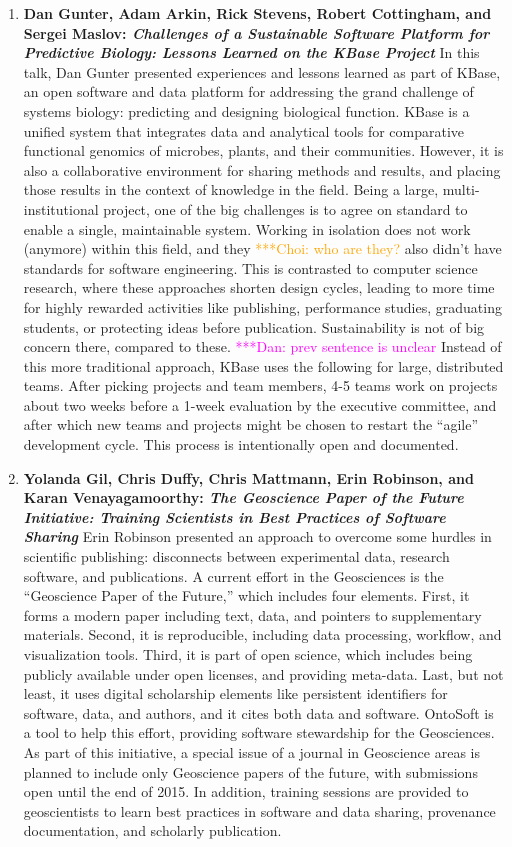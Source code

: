 \documentclass[11pt, oneside]{amsart}
\newcommand{\katznote}[1]{ {\textcolor{magenta}    { ***Dan:      #1 }}}
\newcommand{\choinote}[1]{ {\textcolor{orange}    {***Choi: #1 }}}
\begin{document}
\begin{enumerate}
\item \textbf{Dan Gunter, Adam Arkin, Rick Stevens, Robert Cottingham, and Sergei
Maslov: \textit{Challenges of a Sustainable Software Platform for Predictive
Biology: Lessons Learned on the KBase Project}} In this talk, Dan Gunter
presented experiences and lessons learned as part of KBase, an open software and
data platform for addressing the grand challenge of systems biology: predicting
and designing biological function. KBase is a unified system that integrates
data and analytical tools for comparative functional genomics of microbes,
plants, and their communities. However, it is also a collaborative environment
for sharing methods and results, and placing those results in the context of
knowledge in the field. Being a large, multi-institutional project, one of the
big challenges is to agree on standard to enable a single, maintainable system.
Working in isolation does not work (anymore) within this field, and they \choinote{who are they?} also
didn't have standards for software engineering. This is contrasted to computer
science research, where these approaches shorten design cycles, leading to more
time for highly rewarded activities like publishing, performance studies,
graduating students, or protecting ideas before publication. Sustainability is
not of big concern there, compared to these. \katznote{prev sentence is unclear}
Instead of this more traditional approach, KBase uses the following for large,
distributed teams. After picking projects and team members, 4-5 teams work on
projects about two weeks before a 1-week evaluation by the executive committee,
and after which new teams and projects might be chosen to restart the ``agile''
development cycle. This process is intentionally open and documented.

\item \textbf{Yolanda Gil, Chris Duffy, Chris Mattmann, Erin Robinson, and Karan
Venayagamoorthy: \textit{The Geoscience Paper of the Future Initiative: Training
Scientists in Best Practices of Software Sharing}} Erin Robinson presented an
approach to overcome some hurdles in scientific publishing: disconnects
between experimental data, research software, and publications. A current effort
in the Geosciences is the ``Geoscience Paper of the Future,'' which includes
four elements. First, it forms a modern paper including text, data, and pointers
to supplementary materials. Second, it is reproducible, including data
processing, workflow, and visualization tools. Third, it is part of open
science, which includes being publicly available under open licenses, and
providing meta-data. Last, but not least, it uses digital scholarship elements
like persistent identifiers for software, data, and authors, and it cites both
data and software. OntoSoft is a tool to help this effort, providing software
stewardship for the Geosciences. As part of this initiative, a special issue of
a journal in Geoscience areas is planned to include only Geoscience papers
of the future, with submissions open until the end of 2015. In addition,
training sessions are provided to geoscientists to learn best practices in
software and data sharing, provenance documentation, and scholarly publication.


\end{enumerate}
\end{document}
